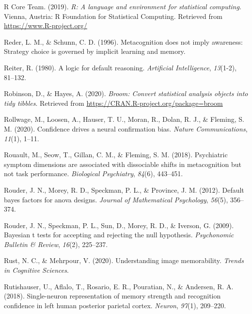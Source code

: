 \documentclass[12pt,twoside]{reedthesis}
\begin{document}
\leavevmode\hypertarget{ref-R-base}{}%
R Core Team. (2019). \emph{R: A language and environment for statistical computing}. Vienna, Austria: R Foundation for Statistical Computing. Retrieved from \url{https://www.R-project.org/}

\leavevmode\hypertarget{ref-reder1996metacognition}{}%
Reder, L. M., \& Schunn, C. D. (1996). Metacognition does not imply awareness: Strategy choice is governed by implicit learning and memory.

\leavevmode\hypertarget{ref-reiter1980logic}{}%
Reiter, R. (1980). A logic for default reasoning. \emph{Artificial Intelligence}, \emph{13}(1-2), 81--132.

\leavevmode\hypertarget{ref-R-broom}{}%
Robinson, D., \& Hayes, A. (2020). \emph{Broom: Convert statistical analysis objects into tidy tibbles}. Retrieved from \url{https://CRAN.R-project.org/package=broom}

\leavevmode\hypertarget{ref-rollwage2020confidence}{}%
Rollwage, M., Loosen, A., Hauser, T. U., Moran, R., Dolan, R. J., \& Fleming, S. M. (2020). Confidence drives a neural confirmation bias. \emph{Nature Communications}, \emph{11}(1), 1--11.

\leavevmode\hypertarget{ref-rouault2018psychiatric}{}%
Rouault, M., Seow, T., Gillan, C. M., \& Fleming, S. M. (2018). Psychiatric symptom dimensions are associated with dissociable shifts in metacognition but not task performance. \emph{Biological Psychiatry}, \emph{84}(6), 443--451.

\leavevmode\hypertarget{ref-rouder2012default}{}%
Rouder, J. N., Morey, R. D., Speckman, P. L., \& Province, J. M. (2012). Default bayes factors for anova designs. \emph{Journal of Mathematical Psychology}, \emph{56}(5), 356--374.

\leavevmode\hypertarget{ref-rouder2009bayesian}{}%
Rouder, J. N., Speckman, P. L., Sun, D., Morey, R. D., \& Iverson, G. (2009). Bayesian t tests for accepting and rejecting the null hypothesis. \emph{Psychonomic Bulletin \& Review}, \emph{16}(2), 225--237.

\leavevmode\hypertarget{ref-rust2020understanding}{}%
Rust, N. C., \& Mehrpour, V. (2020). Understanding image memorability. \emph{Trends in Cognitive Sciences}.

\leavevmode\hypertarget{ref-rutishauser2018single}{}%
Rutishauser, U., Aflalo, T., Rosario, E. R., Pouratian, N., \& Andersen, R. A. (2018). Single-neuron representation of memory strength and recognition confidence in left human posterior parietal cortex. \emph{Neuron}, \emph{97}(1), 209--220.
\end{document}
